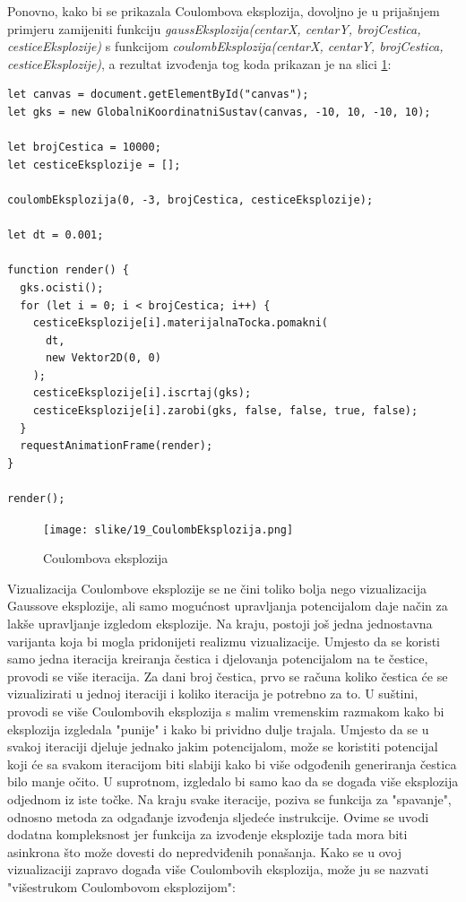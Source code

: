 \documentclass{foi}
\begin{document}
Ponovno, kako bi se prikazala Coulombova eksplozija, dovoljno je u prijašnjem primjeru zamijeniti funkciju \textit{gaussEksplozija(centarX, centarY, brojCestica, cesticeEksplozije)} s funkcijom \textit{coulombEksplozija(centarX, centarY, brojCestica, cesticeEksplozije)}, a rezultat izvođenja tog koda prikazan je na slici \ref{fig:CoulombEksplozija}:

\begin{verbatim}
let canvas = document.getElementById("canvas");
let gks = new GlobalniKoordinatniSustav(canvas, -10, 10, -10, 10);

let brojCestica = 10000;
let cesticeEksplozije = [];

coulombEksplozija(0, -3, brojCestica, cesticeEksplozije);

let dt = 0.001;

function render() {
  gks.ocisti();
  for (let i = 0; i < brojCestica; i++) {
    cesticeEksplozije[i].materijalnaTocka.pomakni(
      dt,
      new Vektor2D(0, 0)
    );
    cesticeEksplozije[i].iscrtaj(gks);
    cesticeEksplozije[i].zarobi(gks, false, false, true, false);
  }
  requestAnimationFrame(render);
}

render();
\end{verbatim}

\begin{figure}[H]
    \centering
    \texttt{[image: slike/19\_CoulombEksplozija.png]}
    \captionsetup{justification=centering}
    \caption{Coulombova eksplozija}
\label{fig:CoulombEksplozija}
\end{figure}

Vizualizacija Coulombove eksplozije se ne čini toliko bolja nego vizualizacija Gaussove eksplozije, ali samo mogućnost upravljanja potencijalom daje način za lakše upravljanje izgledom eksplozije. Na kraju, postoji još jedna jednostavna varijanta koja bi mogla pridonijeti realizmu vizualizacije. Umjesto da se koristi samo jedna iteracija kreiranja čestica i djelovanja potencijalom na te čestice, provodi se više iteracija. Za dani broj čestica, prvo se računa koliko čestica će se vizualizirati u jednoj iteraciji i koliko iteracija je potrebno za to. U suštini, provodi se više Coulombovih eksplozija s malim vremenskim razmakom kako bi eksplozija izgledala "punije" i kako bi prividno dulje trajala. Umjesto da se u svakoj iteraciji djeluje jednako jakim potencijalom, može se koristiti potencijal koji će sa svakom iteracijom biti slabiji kako bi više odgođenih generiranja čestica bilo manje očito. U suprotnom, izgledalo bi samo kao da se događa više eksplozija odjednom iz iste točke. Na kraju svake iteracije, poziva se funkcija za "spavanje", odnosno metoda za odgađanje izvođenja sljedeće instrukcije. Ovime se uvodi dodatna kompleksnost jer funkcija za izvođenje eksplozije tada mora biti asinkrona što može dovesti do nepredviđenih ponašanja. Kako se u ovoj vizualizaciji zapravo događa više Coulombovih eksplozija, može ju se nazvati "višestrukom Coulombovom eksplozijom":
\end{document}
